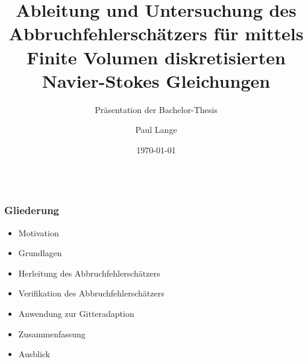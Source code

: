 \documentclass[accentcolor=tud2c,colorbacktitle,inverttitle,landscape,ngerman,presentation,t]{tudbeamer}
\begin{document}
\title[Fabelhafte Benner Boys]{Ableitung und Untersuchung des Abbruchfehlerschätzers für mittels
Finite Volumen diskretisierten Navier-Stokes Gleichungen}


\subtitle{Präsentation der Bachelor-Thesis}

\author{Paul Lange}


\date{\today}

\begin{titleframe}
\begin{figure}[h]
\centering
\vspace{10pt}
\begin{subfigure}[b]{.5\linewidth}
\centering
{}
\end{subfigure}%
\begin{subfigure}[b]{.5\linewidth}
\centering
{}
\end{subfigure}
\end{figure}
\end{titleframe}


\begin{frame}
  \frametitle{\\Gliederung}
  \begin{itemize}
  \item Motivation
  \item Grundlagen
  \item Herleitung des Abbruchfehlerschätzers
  \item Verifikation des Abbruchfehlerschätzers
  \item Anwendung zur Gitteradaption
  \item Zusammenfassung
  \item Ausblick
  \end{itemize}
\end{frame}
\end{document}
